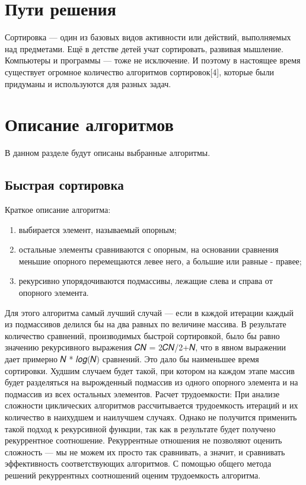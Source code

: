 \section{Пути решения}

Сортировка — один из базовых видов активности или действий, выполняемых над предметами. Ещё в детстве детей учат сортировать, развивая мышление. Компьютеры и программы — тоже не исключение. И поэтому в настоящее время существует огромное количество алгоритмов сортировок[4], которые были придуманы и используются для разных задач.

\section{Описание алгоритмов}
В данном разделе будут описаны выбранные алгоритмы.
\subsection{Быстрая сортировка}
Краткое описание алгоритма:
\begin{enumerate}
	\item выбирается элемент, называемый опорным;
	\item остальные элементы сравниваются с опорным, на основании сравнения меньшие опорного перемещаются левее него, а большие или равные - правее;
	\item рекурсивно упорядочиваются подмассивы, лежащие слева и справа от опорного элемента.
\end{enumerate}
Для этого алгоритма самый лучший случай — если в каждой итерации каждый из подмассивов делился бы на два равных по величине массива. В результате количество сравнений, производимых быстрой
сортировкой, было бы равно значению рекурсивного выражения 𝐶𝑁 = 2𝐶𝑁/2+𝑁, что в явном выражении
дает примерно 𝑁 * 𝑙𝑜𝑔(𝑁) сравнений. Это дало бы наименьшее время сортировки.
Худшим случаем будет такой, при котором на каждом этапе массив будет разделяться на вырожденный подмассив из одного опорного элемента и на подмассив из всех остальных элементов.
Расчет трудоемкости:
При анализе сложности циклических алгоритмов рассчитывается трудоемкость итераций и их количество в наихудшем и наилучшем случаях. Однако не получится применить такой подход к рекурсивной
функции, так как в результате будет получено рекуррентное соотношение. Рекуррентные отношения не
позволяют оценить сложность — мы не можем их просто так сравнивать, а значит, и сравнивать эффективность соответствующих алгоритмов.
С помощью общего метода решений рекуррентных соотношений оценим трудоемкость алгоритма.

